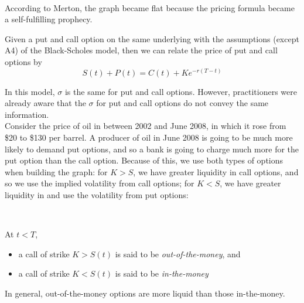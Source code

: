 \documentclass[11pt]{article}
\begin{document}
 \\

According to Merton, the graph became flat because the pricing formula became a self-fulfilling prophecy. \\

\begin{remark} Given a put and call option on the same underlying with the assumptions  (except A4) of the Black-Scholes model, then we can relate the price of put and call options by
$$S(t) + P(t) = C(t) + Ke^{-r(T-t)}$$
\end{remark}
In this model, $\sigma$ is the same for put and call options. However, practitioners were already aware that the $\sigma$ for put and call options do not convey the same information. \\

Consider the price of oil in between 2002 and June 2008, in which it rose from \$20 to \$130 per barrel.  A producer of oil in June 2008 is going to be much more likely to demand put options, and so a bank is going to charge much more for the put option than the call option. Because of this, we use both types of options when building the graph: for $K > S$, we have greater liquidity in call options, and so we use the implied volatility from call options; for $K < S$, we have greater liquidity in and use the volatility from put options: \\

 \\

\begin{definition}[moneyness]
At $t < T$,
\begin{itemize}
\item a call of strike $K > S(t)$ is said to be {\em out-of-the-money}, and
\item a call of strike $K < S(t)$ is said to be {\em in-the-money}
\end{itemize}
\end{definition}
In general, out-of-the-money options are more liquid than those in-the-money.
\end{document}
